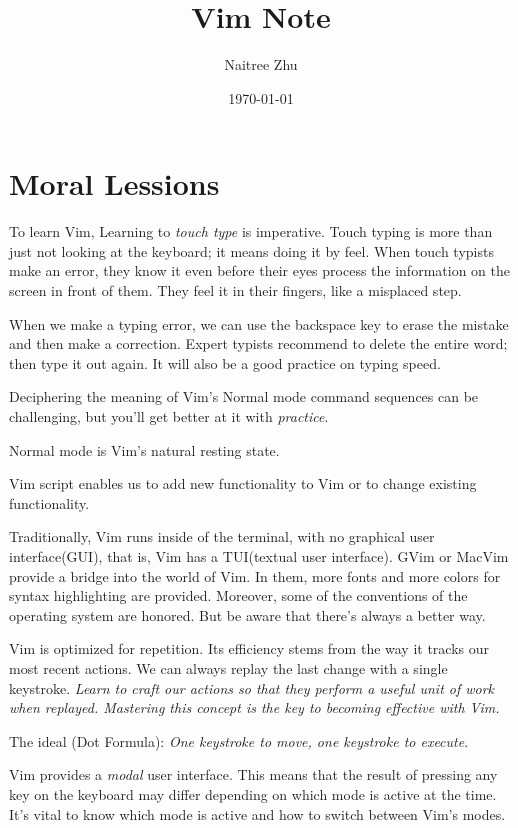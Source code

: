 \title{Vim Note}
\author{Naitree Zhu}
\date{\today}


\maketitle
\part{Moral Lessions}
To learn Vim, Learning to \emph{touch type} is imperative.
Touch typing is more than just not looking at the keyboard; it means doing it by feel. When touch typists make an error, they know it even before their eyes process the information on the screen in front of them. They feel it in their fingers, like a misplaced step.

When we make a typing error, we can use the backspace key to erase the mistake and then make a correction.
Expert typists recommend to delete the entire word; then type it out again.
It will also be a good practice on typing speed.

Deciphering the meaning of Vim's Normal mode command sequences can be challenging, but you'll get better at it with \emph{practice}.


Normal mode is Vim's natural resting state.

Vim script enables us to add new functionality to Vim or to change existing functionality.

Traditionally, Vim runs inside of the terminal, with no graphical user interface(GUI), that is, Vim has a TUI(textual user interface). GVim or MacVim provide a bridge into the world of Vim. In them, more fonts and more colors for syntax highlighting are provided. Moreover, some of the conventions of the operating system are honored. But be aware that there's always a better way.

Vim is optimized for repetition. Its efficiency stems from the way it tracks our most recent actions. We can always replay the last change with a single keystroke. \emph{Learn to craft our actions so that they perform a useful unit of work when replayed. Mastering this concept is the key to becoming effective with Vim.}

The ideal (Dot Formula): \emph{One keystroke to move, one keystroke to execute}.

Vim provides a \emph{modal} user interface. This means that the result of pressing any key on the keyboard may differ depending on which mode is active at the time. It's vital to know which mode is active and how to switch between Vim's modes.

